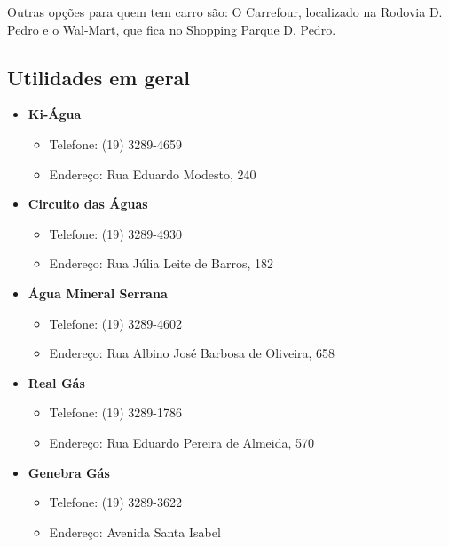 Outras opções para quem tem carro são: O Carrefour, localizado na Rodovia D.
Pedro e o Wal-Mart, que fica no Shopping Parque D. Pedro.

\subsection{Utilidades em geral}

\begin{itemize}
\item  \textbf{Ki-Água}
\begin{itemize}
\item  Telefone: (19) 3289-4659
\item  Endereço: Rua Eduardo Modesto, 240
\end{itemize}
\end{itemize}

\begin{itemize}
\item  \textbf{Circuito das Águas}
\begin{itemize}
\item  Telefone: (19) 3289-4930
\item  Endereço: Rua Júlia Leite de Barros, 182
\end{itemize}
\end{itemize}

\begin{itemize}
\item  \textbf{Água Mineral Serrana}
\begin{itemize}
\item  Telefone: (19) 3289-4602
\item  Endereço: Rua Albino José Barbosa de Oliveira, 658
\end{itemize}
\end{itemize}

\begin{itemize}
\item  \textbf{Real Gás}
\begin{itemize}
\item  Telefone: (19) 3289-1786
\item  Endereço: Rua Eduardo Pereira de Almeida, 570
\end{itemize}
\end{itemize}

\begin{itemize}
\item  \textbf{Genebra Gás}
\begin{itemize}
\item  Telefone: (19) 3289-3622
\item  Endereço: Avenida Santa Isabel
\end{itemize}
\end{itemize}

